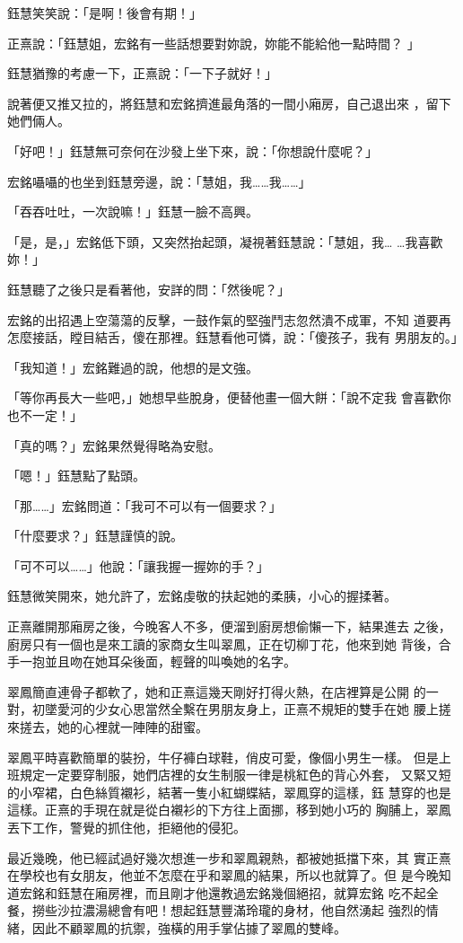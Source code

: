 鈺慧笑笑說：「是啊！後會有期！」

正熹說：「鈺慧姐，宏銘有一些話想要對妳說，妳能不能給他一點時間？
」

鈺慧猶豫的考慮一下，正熹說：「一下子就好！」

說著便又推又拉的，將鈺慧和宏銘擠進最角落的一間小廂房，自己退出來
，留下她們倆人。

「好吧！」鈺慧無可奈何在沙發上坐下來，說：「你想說什麼呢？」

宏銘囁囁的也坐到鈺慧旁邊，說：「慧姐，我……我……」

「吞吞吐吐，一次說嘛！」鈺慧一臉不高興。

「是，是，」宏銘低下頭，又突然抬起頭，凝視著鈺慧說：「慧姐，我…
…我喜歡妳！」

鈺慧聽了之後只是看著他，安詳的問：「然後呢？」

宏銘的出招遇上空蕩蕩的反擊，一鼓作氣的堅強鬥志忽然潰不成軍，不知
道要再怎麼接話，瞠目結舌，傻在那裡。鈺慧看他可憐，說：「傻孩子，我有
男朋友的。」

「我知道！」宏銘難過的說，他想的是文強。

「等你再長大一些吧，」她想早些脫身，便替他畫一個大餅：「說不定我
會喜歡你也不一定！」

「真的嗎？」宏銘果然覺得略為安慰。

「嗯！」鈺慧點了點頭。

「那……」宏銘問道：「我可不可以有一個要求？」

「什麼要求？」鈺慧謹慎的說。

「可不可以……」他說：「讓我握一握妳的手？」

鈺慧微笑開來，她允許了，宏銘虔敬的扶起她的柔胰，小心的握揉著。

正熹離開那廂房之後，今晚客人不多，便溜到廚房想偷懶一下，結果進去
之後，廚房只有一個也是來工讀的家商女生叫翠鳳，正在切柳丁花，他來到她
背後，合手一抱並且吻在她耳朵後面，輕聲的叫喚她的名字。

翠鳳簡直連骨子都軟了，她和正熹這幾天剛好打得火熱，在店裡算是公開
的一對，初墜愛河的少女心思當然全繫在男朋友身上，正熹不規矩的雙手在她
腰上搓來搓去，她的心裡就一陣陣的甜蜜。

翠鳳平時喜歡簡單的裝扮，牛仔褲白球鞋，俏皮可愛，像個小男生一樣。
但是上班規定一定要穿制服，她們店裡的女生制服一律是桃紅色的背心外套，
又緊又短的小窄裙，白色絲質襯衫，結著一隻小紅蝴蝶結，翠鳳穿的這樣，鈺
慧穿的也是這樣。正熹的手現在就是從白襯衫的下方往上面挪，移到她小巧的
胸脯上，翠鳳丟下工作，警覺的抓住他，拒絕他的侵犯。

最近幾晚，他已經試過好幾次想進一步和翠鳳親熱，都被她抵擋下來，其
實正熹在學校也有女朋友，他並不怎麼在乎和翠鳳的結果，所以也就算了。但
是今晚知道宏銘和鈺慧在廂房裡，而且剛才他還教過宏銘幾個絕招，就算宏銘
吃不起全餐，撈些沙拉濃湯總會有吧！想起鈺慧豐滿玲瓏的身材，他自然湧起
強烈的情緒，因此不顧翠鳳的抗禦，強橫的用手掌佔據了翠鳳的雙峰。

